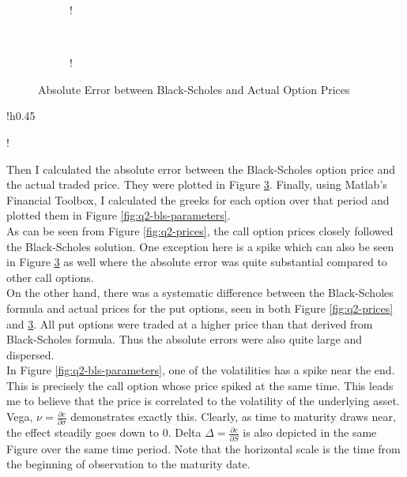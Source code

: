 \documentclass[11pt, fleqn]{article}
\begin{document}
\begin{figure}[!h]
   \centering 
   \begin{subfigure}[b]{0.45\textwidth}
     	\resizebox {\textwidth} {!} { }
		\label{fig:q2-error}
    \end{subfigure}
    ~
    \begin{subfigure}[b]{0.45\textwidth}
       	\resizebox {\textwidth} {!} { }
        \label{fig:q2-error-boxplot}
    \end{subfigure}
	\vspace{-0.5cm}
    \caption{Absolute Error between Black-Scholes and Actual Option Prices}
	\label{fig:q2-error-both}
\end{figure}

\begin{wrapfigure}{!h}{0.45\textwidth}
\vspace{-1.5cm}
\begin{center}
	\resizebox {0.4\textwidth} {!} { }
	\caption{Black-Scholes Parameters}
	\label{fig:q2-bls-parameters}
	\vspace{-1cm}
\end{center}
\end{wrapfigure}

Then I calculated the absolute error between the Black-Scholes option price and the actual traded price. They were plotted in Figure \ref{fig:q2-error-both}. Finally, using Matlab's Financial Toolbox, I calculated the greeks for each option over that period and plotted them in Figure \ref{fig:q2-bls-parameters}.\\

As can be seen from Figure \ref{fig:q2-prices}, the call option prices closely followed the Black-Scholes solution. One exception here is a spike which can also be seen in Figure \ref{fig:q2-error-both} as well where the absolute error was quite substantial compared to other call options.\\

On the other hand, there was a systematic difference between the Black-Scholes formula and actual prices for the put options, seen in both Figure \ref{fig:q2-prices} and \ref{fig:q2-error-both}. All put options were traded at a higher price than that derived from Black-Scholes formula. Thus the absolute errors were also quite large and dispersed.\\

In Figure \ref{fig:q2-bls-parameters}, one of the volatilities has a spike near the end. This is precisely the call option whose price spiked at the same time. This leads me to believe that the price is correlated to the volatility of the underlying asset. Vega, $\nu=\frac{\partial c}{\partial \sigma}$ demonstrates exactly this. Clearly, as time to maturity draws near, the effect steadily goes down to 0. Delta $\Delta=\frac{\partial c}{\partial S}$ is also depicted in the same Figure over the same time period. Note that the horizontal scale is the time from the beginning of observation to the maturity date.
\end{document}

